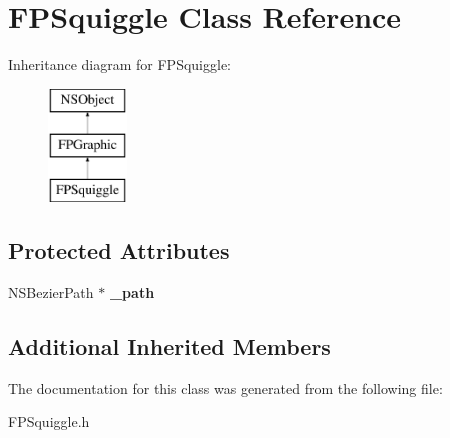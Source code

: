 \hypertarget{interface_f_p_squiggle}{}\section{F\+P\+Squiggle Class Reference}
\label{interface_f_p_squiggle}
Inheritance diagram for F\+P\+Squiggle\+:\begin{figure}[H]
\begin{center}
\leavevmode
\includegraphics[height=3.000000cm]{interface_f_p_squiggle}
\end{center}
\end{figure}
\subsection*{Protected Attributes}
\begin{DoxyCompactItemize}
\item 
\mbox{\label{interface_f_p_squiggle_a5c97a3a63bbac57ab73f49d2f444d715}} 
N\+S\+Bezier\+Path $\ast$ {\bfseries \+\_\+path}
\end{DoxyCompactItemize}
\subsection*{Additional Inherited Members}


The documentation for this class was generated from the following file\+:\begin{DoxyCompactItemize}
\item 
F\+P\+Squiggle.\+h\end{DoxyCompactItemize}
